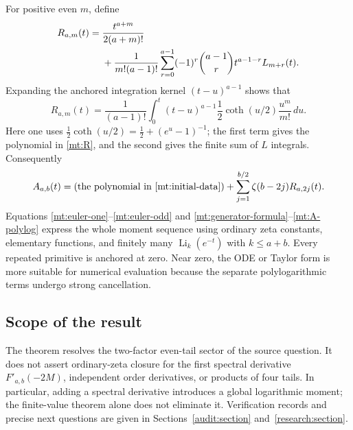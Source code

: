 For positive even $m$, define
\begin{align}
 R_{a,m}(t)={}&\frac{t^{a+m}}{2(a+m)!}
 \notag\\
 &+\frac1{m!(a-1)!}\sum_{r=0}^{a-1}(-1)^r\binom{a-1}{r}
                                  t^{a-1-r}L_{m+r}(t).
 \label{mt:R}
\end{align}
Expanding the anchored integration kernel $(t-u)^{a-1}$ shows that
\begin{equation}\label{mt:R-integral}
 R_{a,m}(t)=\frac1{(a-1)!}\int_0^t(t-u)^{a-1}
                         \frac12\coth(u/2)\frac{u^m}{m!}\,du.
\end{equation}
Here one uses $\tfrac12\coth(u/2)=\tfrac12+(e^u-1)^{-1}$;
the first term gives the polynomial in \eqref{mt:R}, and the second
gives the finite sum of $L$ integrals. Consequently
\begin{equation}\label{mt:A-polylog}
 A_{a,b}(t)=(\text{the polynomial in \eqref{mt:initial-data}})
              +\sum_{j=1}^{b/2}\zeta(b-2j)R_{a,2j}(t).
\end{equation}
Equations \eqref{mt:euler-one}--\eqref{mt:euler-odd} and
\eqref{mt:generator-formula}--\eqref{mt:A-polylog} express the whole
moment sequence using ordinary zeta constants, elementary functions,
and finitely many $\operatorname{Li}_k(e^{-t})$ with $k\le a+b$.
Every repeated primitive is anchored at zero. Near zero, the ODE or
Taylor form is more suitable for numerical evaluation because the
separate polylogarithmic terms undergo strong cancellation.

\subsection{Scope of the result}

The theorem resolves the two-factor even-tail sector of the source
question. It does not assert ordinary-zeta closure for the first
spectral derivative $F'_{a,b}(-2M)$, independent order derivatives,
or products of four tails. In particular, adding a spectral derivative
introduces a global logarithmic moment; the finite-value theorem alone
does not eliminate it. Verification records and precise next questions
are given in Sections~\ref{audit:section} and~\ref{research:section}.

